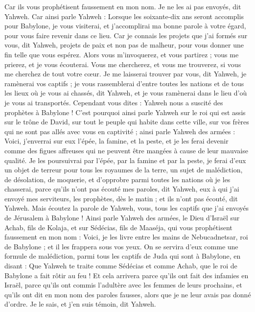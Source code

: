 \begin{multicols}{2}
Car ils vous prophétisent faussement en mon nom. Je ne les ai pas envoyés, dit Yahweh.
Car ainsi parle Yahweh : Lorsque les soixante-dix ans seront accomplis pour Babylone, je vous visiterai, et j’accomplirai ma bonne parole à votre égard, pour vous faire revenir dans ce lieu.
Car je connais les projets que j'ai formés sur vous, dit Yahweh, projets de paix et non pas de malheur, pour vous donner une fin telle que vous espérez.
Alors vous m'invoquerez, et vous partirez ; vous me prierez, et je vous écouterai.
Vous me chercherez, et vous me trouverez, si vous me cherchez de tout votre cœur.
Je me laisserai trouver par vous, dit Yahweh, je ramènerai vos captifs ; je vous rassemblerai d'entre toutes les nations et de tous les lieux où je vous ai chassés, dit Yahweh, et je vous ramènerai dans le lieu d’où je vous ai transportés.
Cependant vous dites : Yahweh nous a suscité des prophètes à Babylone !
C'est pourquoi ainsi parle Yahweh sur le roi qui est assis sur le trône de David, sur tout le peuple qui habite dans cette ville, sur vos frères qui ne sont pas allés avec vous en captivité ;
ainsi parle Yahweh des armées : Voici, j’enverrai sur eux l'épée, la famine, et la peste, et je les ferai devenir comme des figues affreuses qui ne peuvent être mangées à cause de leur mauvaise qualité.
Je les poursuivrai par l'épée, par la famine et par la peste, je ferai d’eux un objet de terreur pour tous les royaumes de la terre, un sujet de malédiction, de désolation, de moquerie, et d’opprobre parmi toutes les nations où je les chasserai,
parce qu'ils n'ont pas écouté mes paroles, dit Yahweh, eux à qui j’ai envoyé mes serviteurs, les prophètes, dès le matin ; et ils n'ont pas écouté, dit Yahweh.
Mais écoutez la parole de Yahweh, vous, tous les captifs que j'ai envoyés de Jérusalem à Babylone !
Ainsi parle Yahweh des armées, le Dieu d'Israël sur Achab, fils de Kolaja, et sur Sédécias, fils de Maaséja, qui vous prophétisent faussement en mon nom : Voici, je les livre entre les mains de Nebucadnetsar, roi de Babylone ; et il les frappera sous vos yeux.
On se servira d'eux comme une formule de malédiction, parmi tous les captifs de Juda qui sont à Babylone, en disant : Que Yahweh te traite comme Sédécias et comme Achab, que le roi de Babylone a fait rôtir au feu !
Et cela arrivera parce qu'ils ont fait des infamies en Israël, parce qu'ils ont commis l’adultère avec les femmes de leurs prochains, et qu'ils ont dit en mon nom des paroles fausses, alors que je ne leur avais pas donné d’ordre. Je le sais, et j'en suis témoin, dit Yahweh.

\end{multicols}
